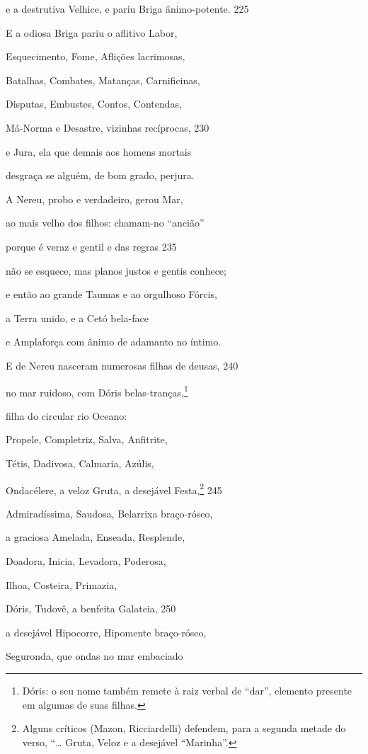 e a destrutiva Velhice, e pariu Briga ânimo-potente. \num{225}

\quad{}E a odiosa Briga pariu o aflitivo Labor,

Esquecimento, Fome, Aflições lacrimosas,

Batalhas, Combates, Matanças, Carnificinas,

Disputas, Embustes, Contos, Contendas,

Má-Norma e Desastre, vizinhas recíprocas, \num{230}

e Jura, ela que demais aos homens mortais

desgraça se alguém, de bom grado, perjura.

\medskip

A Nereu, probo e verdadeiro, gerou Mar,

ao mais velho dos filhos: chamam-no ``ancião''

porque é veraz e gentil e das regras \num{235}

não se esquece, mas planos justos e gentis conhece;

e então ao grande Taumas e ao orgulhoso Fórcis,

a Terra unido, e a Cetó bela-face

e Amplaforça com ânimo de adamanto no íntimo.

E de Nereu nasceram numerosas filhas de deusas, \num{240}

no mar ruidoso, com Dóris belas-tranças,\footnote{Dóris: o seu nome também remete à raiz verbal de ``dar'', elemento presente em algumas de suas filhas.}

filha do circular rio Oceano:

Propele, Completriz, Salva, Anfitrite,

Tétis, Dadivosa, Calmaria, Azúlis,

Ondacélere, a veloz Gruta, a desejável Festa,\footnote{Alguns críticos (Mazon, Ricciardelli) defendem, para a segunda
metade do verso, ``\ldots{} Gruta, Veloz e a desejável ``Marinha''.} \num{245}

Admiradíssima, Saudosa, Belarrixa braço-róseo,

a graciosa Amelada, Enseada, Resplende,

Doadora, Inicia, Levadora, Poderosa,

Ilhoa, Costeira, Primazia,

Dóris, Tudovê, a benfeita Galateia, \num{250}

a desejável Hipocorre, Hipomente braço-róseo,

Seguronda, que ondas no mar embaciado

